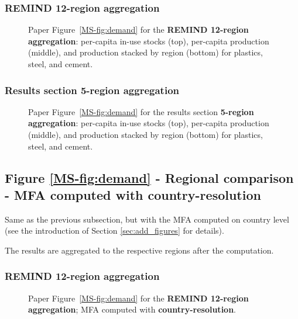 \subsubsection{REMIND 12-region aggregation}
\begin{figure}[htbp]
    \centering
    \caption{Paper Figure~\ref{MS-fig:demand} for the \textbf{REMIND 12-region aggregation}: per-capita in-use stocks (top), per-capita production (middle), and production stacked by region (bottom) for plastics, steel, and cement.}
    \label{fig:figure_8_h12}
\end{figure}

\clearpage
\subsubsection{Results section 5-region aggregation}
\begin{figure}[htbp]
    \centering
    \caption{Paper Figure~\ref{MS-fig:demand} for the results section \textbf{5-region aggregation}: per-capita in-use stocks (top), per-capita production (middle), and production stacked by region (bottom) for plastics, steel, and cement.}
    \label{fig:figure_8_agg5}
\end{figure}


\clearpage
\subsection{Figure \texorpdfstring{\ref{MS-fig:demand}}{5} - Regional comparison - MFA computed with country-resolution} \label{sec:add_fig_8_countries}

Same as the previous subsection, but with the MFA computed on country level (see the introduction of Section \ref{sec:add_figures} for details).

The results are aggregated to the respective regions after the computation.

\subsubsection{REMIND 12-region aggregation}
\begin{figure}[htbp]
    \centering
    \caption{Paper Figure~\ref{MS-fig:demand} for the \textbf{REMIND 12-region aggregation}; MFA computed with \textbf{country-resolution}.}
    \label{fig:figure_8_h12_countries}
\end{figure}


